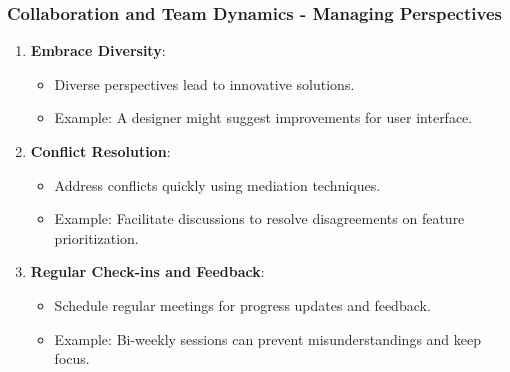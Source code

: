 \documentclass{beamer}
\begin{document}
\begin{frame}[fragile]
    \frametitle{Collaboration and Team Dynamics - Managing Perspectives}
    \begin{enumerate}
        \item \textbf{Embrace Diversity}:
            \begin{itemize}
                \item Diverse perspectives lead to innovative solutions.
                \item Example: A designer might suggest improvements for user interface.
            \end{itemize}

        \item \textbf{Conflict Resolution}:
            \begin{itemize}
                \item Address conflicts quickly using mediation techniques.
                \item Example: Facilitate discussions to resolve disagreements on feature prioritization.
            \end{itemize}
        
        \item \textbf{Regular Check-ins and Feedback}:
            \begin{itemize}
                \item Schedule regular meetings for progress updates and feedback.
                \item Example: Bi-weekly sessions can prevent misunderstandings and keep focus.
            \end{itemize}
    \end{enumerate}
\end{frame}
\end{document}
